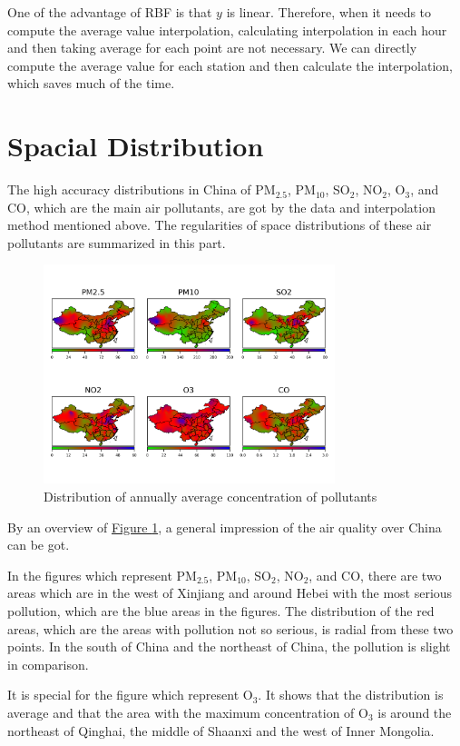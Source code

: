 \documentclass[letterpaper]{article}
\begin{document}
\begin{CJK*}{UTF8}{gkai}
 One of the advantage of RBF is that $y$ is linear. Therefore, when it needs to compute the average value interpolation, calculating interpolation in each hour and then taking average for each point are not necessary. We can directly compute the average value for each station and then calculate the interpolation, which saves much of the time.

\section{Spacial Distribution}

The high accuracy distributions in China of PM$_{2.5}$, PM$_{10}$, SO$_{2}$, NO$_{2}$, O$_{3}$, and CO, which are the main air pollutants, are got by the data and interpolation method mentioned above. The regularities of space distributions of these air pollutants are summarized in this part.
\begin{figure}[h]
  \includegraphics[width = 8.5cm]{Interpolation_from_20150102_to_20151231_linear.png}
  \caption{Distribution of annually average concentration of pollutants}
  \label{figure:1}
  \centering
\end{figure}

By an overview of \hyperref[figure:1]{Figure \ref*{figure:1}}, a general impression of the air quality over China can be got.

In the figures which represent PM$_{2.5}$, PM$_{10}$, SO$_{2}$, NO$_{2}$, and CO, there are two areas which are in the west of Xinjiang and around Hebei with the most serious pollution, which are the blue areas in the figures. The distribution of the red areas, which are the areas with pollution not so serious, is radial from these two points. In the south of China and the northeast of China, the pollution is slight in comparison.

It is special for the figure which represent O$_{3}$. It shows that the distribution is average and that the area with the maximum concentration of O$_{3}$ is around the northeast of Qinghai, the middle of Shaanxi and the west of Inner Mongolia.



\end{CJK*}
\end{document}
